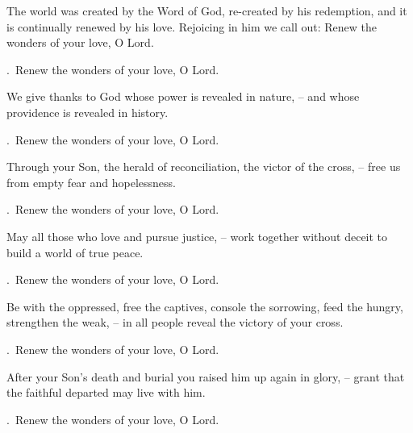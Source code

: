 \lettrine[loversize=0.15,lines=2]{T}{}he world was created by the Word of God, re-created by his redemption, and it is continually renewed by his love. Rejoicing in him we call out: Renew the wonders of your love, O Lord.
\par \Rbar.~Renew the wonders of your love, O Lord.

We give thanks to God whose power is revealed in nature,
– and whose providence is revealed in history.
\par \Rbar.~Renew the wonders of your love, O Lord.

Through your Son, the herald of reconciliation, the victor of the cross,
– free us from empty fear and hopelessness.
\par \Rbar.~Renew the wonders of your love, O Lord.

May all those who love and pursue justice,
– work together without deceit to build a world of true peace.
\par \Rbar.~Renew the wonders of your love, O Lord.

Be with the oppressed, free the captives, console the sorrowing, feed the hungry, strengthen the weak,
– in all people reveal the victory of your cross.
\par \Rbar.~Renew the wonders of your love, O Lord.

After your Son’s death and burial you raised him up again in glory,
– grant that the faithful departed may live with him.
\par \Rbar.~Renew the wonders of your love, O Lord.
